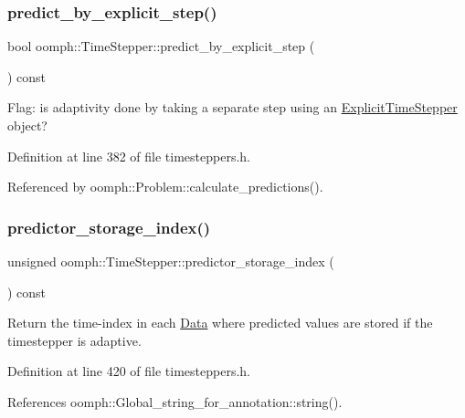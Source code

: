 \subsubsection{\texorpdfstring{predict\+\_\+by\+\_\+explicit\+\_\+step()}{predict\_by\_explicit\_step()}}
{\footnotesize\ttfamily bool oomph\+::\+Time\+Stepper\+::predict\+\_\+by\+\_\+explicit\+\_\+step (\begin{DoxyParamCaption}{ }\end{DoxyParamCaption}) const\hspace{0.3cm}{\ttfamily [inline]}}



Flag\+: is adaptivity done by taking a separate step using an \hyperlink{classoomph_1_1ExplicitTimeStepper}{Explicit\+Time\+Stepper} object? 



Definition at line 382 of file timesteppers.\+h.



Referenced by oomph\+::\+Problem\+::calculate\+\_\+predictions().

\mbox{\label{classoomph_1_1TimeStepper_a31e756a339277e21f74b21a5d61c9841}} 
\subsubsection{\texorpdfstring{predictor\+\_\+storage\+\_\+index()}{predictor\_storage\_index()}}
{\footnotesize\ttfamily unsigned oomph\+::\+Time\+Stepper\+::predictor\+\_\+storage\+\_\+index (\begin{DoxyParamCaption}{ }\end{DoxyParamCaption}) const\hspace{0.3cm}{\ttfamily [inline]}}



Return the time-\/index in each \hyperlink{classoomph_1_1Data}{Data} where predicted values are stored if the timestepper is adaptive. 



Definition at line 420 of file timesteppers.\+h.



References oomph\+::\+Global\+\_\+string\+\_\+for\+\_\+annotation\+::string().

